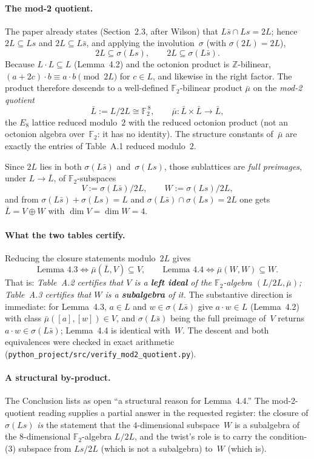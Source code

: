 \documentclass[11pt]{amsart}
\newcommand{\ZZ}{\mathbb{Z}}
\newcommand{\FF}{\mathbb{F}}
\theoremstyle{remark}
\begin{document}
\paragraph{The mod-2 quotient.}
The paper already states (Section~2.3, after Wilson) that
$L\bar s\cap Ls=2L$; hence $2L\subseteq Ls$ and $2L\subseteq L\bar s$,
and applying the involution~$\sigma$ (with $\sigma(2L)=2L$),
\[
  2L\subseteq\sigma(Ls),\qquad 2L\subseteq\sigma(L\bar s).
\]
Because $L\cdot L\subseteq L$ (Lemma~4.2) and the octonion product is
$\ZZ$-bilinear, $(a+2c)\cdot b\equiv a\cdot b\pmod{2L}$ for $c\in L$,
and likewise in the right factor.  The product therefore descends to a
well-defined $\FF_2$-bilinear product $\bar\mu$ on the \emph{mod-2
quotient}
\[
  \bar L:=L/2L\cong\FF_2^{\,8},
  \qquad \bar\mu:\bar L\times\bar L\to\bar L,
\]
the $E_8$ lattice reduced modulo~$2$ with the reduced octonion product
(not an octonion algebra over~$\FF_2$: it has no identity).  The structure constants of~$\bar\mu$ are exactly
the entries of Table~A.1 reduced modulo~$2$.

Since $2L$ lies in both $\sigma(L\bar s)$ and~$\sigma(Ls)$, those
sublattices are \emph{full preimages}, under $L\to\bar L$, of
$\FF_2$-subspaces
\[
  V:=\sigma(L\bar s)/2L,\qquad W:=\sigma(Ls)/2L,
\]
and from $\sigma(L\bar s)+\sigma(Ls)=L$ and
$\sigma(L\bar s)\cap\sigma(Ls)=2L$ one gets $\bar L=V\oplus W$ with
$\dim V=\dim W=4$.

\paragraph{What the two tables certify.}
Reducing the closure statements modulo~$2L$ gives
\[
  \text{Lemma~4.3}\iff\bar\mu(\bar L,V)\subseteq V,\qquad
  \text{Lemma~4.4}\iff\bar\mu(W,W)\subseteq W.
\]
That is: \emph{Table~A.2 certifies that $V$ is a \textbf{left ideal} of
the $\FF_2$-algebra $(L/2L, \bar\mu)$; Table~A.3 certifies that $W$ is a
\textbf{subalgebra} of it.}  The substantive direction is immediate:
for Lemma~4.3, $a\in L$ and $w\in\sigma(L\bar s)$ give $a\cdot w\in L$
(Lemma~4.2) with class $\bar\mu([a],[w])\in V$, and $\sigma(L\bar s)$
being the full preimage of~$V$ returns $a\cdot w\in\sigma(L\bar s)$;
Lemma~4.4 is identical with~$W$.  The descent and both equivalences
were checked in exact arithmetic
(\texttt{python\_project/src/verify\_mod2\_quotient.py}).

\paragraph{A structural by-product.}
The Conclusion lists as open ``a structural reason for Lemma~4.4.''
The mod-2-quotient reading supplies a partial answer in the requested
register: the closure of $\sigma(Ls)$ \emph{is} the statement that the
$4$-dimensional subspace~$W$ is a subalgebra of the $8$-dimensional
$\FF_2$-algebra $L/2L$, and the twist's role is to carry the
condition-(3) subspace from $Ls/2L$ (which is not a subalgebra)
to~$W$ (which is).
\end{document}
